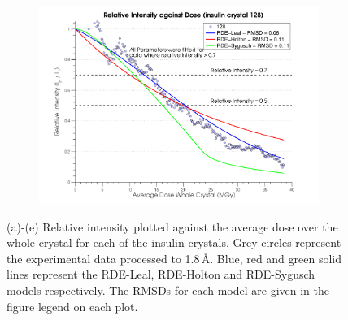 \begin{figure}[H]
    \ContinuedFloat
    \centering
    \begin{subfigure}[b]{1\textwidth}
        \centering
        \includegraphics[width=\textwidth]{figures/dwd/relintplot128.pdf}
        \caption{}
        \label{Relative Intensity Plots - 128}
    \end{subfigure}
    \caption{(a)-(e) Relative intensity plotted against the average dose over the whole crystal for each of the insulin crystals. Grey circles represent the experimental data processed to 1.8\,\AA. Blue, red and green solid lines represent the RDE-Leal, RDE-Holton and RDE-Sygusch models respectively. The RMSDs for each model are given in the figure legend on each plot.}
    \label{fig:Relative Intensity Plots}
\end{figure}

